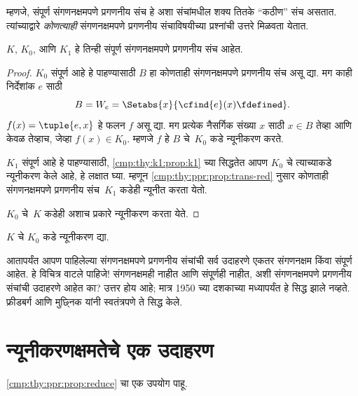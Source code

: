 म्हणजे, संपूर्ण संगणनक्षमपणे प्रगणनीय संच हे अशा संचांमधील
शक्य तितके ``कठीण'' संच असतात. त्यांच्याद्वारे
\emph{कोणत्याही} संगणनक्षमपणे प्रगणनीय संचाविषयीच्या
प्रश्नांची उत्तरे मिळवता येतात.

\begin{thm}
$K$, $K_0$, आणि $K_1$ हे तिन्ही संपूर्ण संगणनक्षमपणे
प्रगणनीय संच आहेत.
\end{thm}

\begin{proof}
$K_0$ संपूर्ण आहे हे पाहण्यासाठी $B$ हा कोणताही
संगणनक्षमपणे प्रगणनीय संच असू द्या. मग काही निर्देशांक $e$
साठी
\[B = W_e = \Setabs{x}{\cfind{e}(x) \fdefined}.
\]
$f(x) = \tuple{e, x}$ हे फलन $f$ असू द्या. मग प्रत्येक
नैसर्गिक संख्या $x$ साठी $x \in B$ तेव्हा आणि केवळ तेव्हाच, जेव्हा
$f(x) \in K_0$. म्हणजे $f$ हे $B$ चे~$K_0$ कडे
न्यूनीकरण करते.

$K_1$ संपूर्ण आहे हे पाहण्यासाठी, \ref{cmp:thy:k1:prop:k1}
च्या सिद्धतेत आपण $K_0$ चे त्याच्याकडे न्यूनीकरण केले
आहे, हे लक्षात घ्या. म्हणून \ref{cmp:thy:ppr:prop:trans-red}
नुसार कोणताही संगणनक्षमपणे प्रगणनीय संच~$K_1$ कडेही
न्यूनीत करता येतो.

$K_0$ चे~$K$ कडेही अशाच प्रकारे न्यूनीकरण करता येते.

\end{proof}

\begin{prob}
$K$ चे $K_0$ कडे न्यूनीकरण द्या.
\end{prob}

\begin{digress}
आतापर्यंत आपण पाहिलेल्या संगणनक्षमपणे प्रगणनीय संचांची सर्व
उदाहरणे एकतर संगणनक्षम किंवा संपूर्ण आहेत. हे विचित्र वाटले
पाहिजे!{} संगणनक्षमही नाहीत आणि संपूर्णही नाहीत, अशी
संगणनक्षमपणे प्रगणनीय संचांची उदाहरणे आहेत का? उत्तर होय
आहे; मात्र 1950 च्या दशकाच्या मध्यापर्यंत हे सिद्ध झाले
नव्हते. फ्रीडबर्ग आणि मुछ्निक यांनी स्वतंत्रपणे ते सिद्ध केले.
\end{digress}











\section{न्यूनीकरणक्षमतेचे एक उदाहरण}\label{cmp:thy:k1:sec}

\ref{cmp:thy:ppr:prop:reduce} चा एक उपयोग पाहू.

